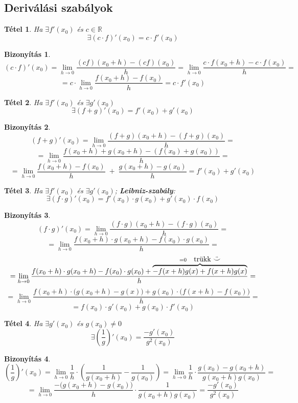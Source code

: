 \documentclass[a4paper,12pt,twoside]{book}
\newtheorem{tetel}{Tétel}[chapter]
\theoremstyle{break}
\newtheorem{biz}{Bizonyítás}[chapter]
\theoremstyle{plain}
\begin{document}
\subsection{Deriválási szabályok}

\begin{tetel} Ha $\exists f'(x_0)$ és $c\in\mathbb{R}$
 \[\boxed{\exists(c\cdot f)'(x_0) = c\cdot f'(x_0)}\]
\end{tetel}
\begin{biz}
 \[(c\cdot f)'(x_0) = \lim_{h\to 0} \frac{(cf)(x_0+h)-(cf)(x_0)}{h} = \lim_{h\to 0} \frac{c\cdot f(x_0+h)-c\cdot f(x_0)}{h} =\]
 \[ = c\cdot\lim_{h\to 0} \frac{f(x_0+h)-f(x_0)}{h} = c\cdot f'(x_0)\]
\end{biz}

\begin{tetel} Ha $\exists f'(x_0)$ és $\exists g'(x_0)$
 \[\boxed{\exists(f+g)'(x_0) = f'(x_0)+g'(x_0)}\]
\end{tetel}
\begin{biz}
 \[(f+g)'(x_0) = \lim_{h\to 0} \frac{(f+g)(x_0+h)-(f+g)(x_0)}{h} = \]
 \[ = \lim_{h\to 0} \frac{f(x_0+h)+g(x_0+h)-(f(x_0)+g(x_0))}{h} =\]
 \[ = \lim_{h\to 0} \frac{f(x_0+h)-f(x_0)}{h} \; + \; \frac{g(x_0+h)-g(x_0)}{h} = f'(x_0) + g'(x_0)\]
\end{biz}

\begin{tetel} Ha $\exists f'(x_0)$ és $\exists g'(x_0)$; \textbf{Leibniz-szabály}:
 \[\boxed{\exists(f\cdot g)'(x_0) = f'(x_0)\cdot g(x_0) + g'(x_0)\cdot f(x_0)}\]
\end{tetel}
\begin{biz}
 \[(f\cdot g)'(x_0) = \lim_{h\to 0} \frac{(f\cdot g)(x_0+h)-(f\cdot g)(x_0)}{h} = \]
 \[ = \lim_{h\to 0} \frac{f(x_0+h)\cdot g(x_0+h)-f(x_0)\cdot g(x_0)}{h} =\]
 \[ = \lim_{h\to 0} \frac{f(x_0+h)\cdot g(x_0+h)-f(x_0)\cdot g(x_0)+\overbrace{-f(x+h)g(x)+f(x+h)g(x)}^{=0 \quad \hbox{trükk $\ddot\smile$}}}{h} =\]
 \[ = \lim_{h\to 0} \frac{f(x_0+h)\cdot \Big(g(x_0+h)-g(x)\Big)+g(x_0)\cdot\Big(f(x+h)-f(x_0)\Big)}{h} = \]
 \[ = f(x_0)\cdot g'(x_0)+g(x_0)\cdot f'(x_0)\]
\end{biz}

\begin{tetel} Ha $\exists g'(x_0)$ és $g(x_0) \neq 0$
 \[\boxed{\exists\left(\frac{1}{g}\right)'(x_0) = \frac{-g'(x_0)}{g^2(x_0)}}\]
\end{tetel}
\begin{biz}
 \[\left(\frac{1}{g}\right)'(x_0) = \lim_{h\to 0} \frac{1}{h}\cdot\left(\frac{1}{g(x_0+h)}-\frac{1}{g(x_0)}\right) = \lim_{h\to 0} \frac{1}{h}\cdot \frac{g(x_0)-g(x_0+h)}{g(x_0+h)g(x_0)} = \]
 \[ = \lim_{h\to 0} \frac{-\Big(g(x_0+h)-g(x_0)\Big)}{h}\cdot\frac{1}{g(x_0+h)g(x_0)} = \frac{-g'(x_0)}{g^2(x_0)}\]
\end{biz}
\end{document}
